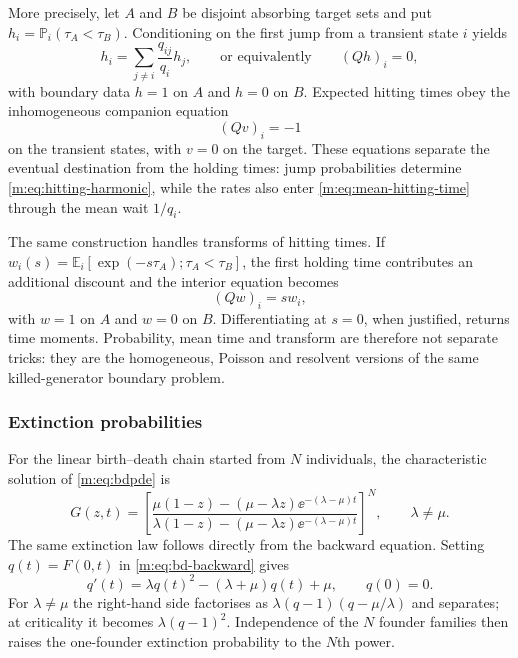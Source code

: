 More precisely, let $A$ and $B$ be disjoint absorbing target sets and put
$h_i=\mathbb P_i(\tau_A<\tau_B)$.  Conditioning on the first jump from a transient
state $i$ yields
\begin{equation}
  h_i=\sum_{j\neq i}\frac{q_{ij}}{q_i}h_j,
  \qquad\text{or equivalently}\qquad
  (Qh)_i=0,
  \label{m:eq:hitting-harmonic}
\end{equation}
with boundary data $h=1$ on $A$ and $h=0$ on $B$.  Expected hitting times obey
the inhomogeneous companion equation
\begin{equation}
  (Qv)_i=-1
  \label{m:eq:mean-hitting-time}
\end{equation}
on the transient states, with $v=0$ on the target.  These equations separate the
eventual destination from the holding times: jump probabilities determine
\cref{m:eq:hitting-harmonic}, while the rates also enter
\cref{m:eq:mean-hitting-time} through the mean wait $1/q_i$.

The same construction handles transforms of hitting times.  If
$w_i(s)=\mathbb E_i[\exp(-s\tau_A);\tau_A<\tau_B]$, the first holding time
contributes an additional discount and the interior equation becomes
\begin{equation}
  (Qw)_i=s w_i,
  \label{m:eq:hitting-laplace}
\end{equation}
with $w=1$ on $A$ and $w=0$ on $B$.  Differentiating at $s=0$, when justified,
returns time moments.  Probability, mean time and transform are therefore not
separate tricks: they are the homogeneous, Poisson and resolvent versions of the
same killed-generator boundary problem.

\subsubsection{Extinction probabilities}\label{m:sec:extinction-probabilities}

For the linear birth--death chain started from $N$ individuals, the characteristic
solution of \cref{m:eq:bdpde} is \cite{Kendall1948}
\begin{equation}
  G(z,t)=
  \left[
  \frac{\mu(1-z)-(\mu-\lambda z)\ee^{-(\lambda-\mu)t}}
       {\lambda(1-z)-(\mu-\lambda z)\ee^{-(\lambda-\mu)t}}
  \right]^N,
  \qquad \lambda\neq\mu.
  \label{m:eq:bdsolution}
\end{equation}
The same extinction law follows directly from the backward equation.  Setting
$q(t)=F(0,t)$ in \cref{m:eq:bd-backward} gives
\begin{equation}
  q'(t)=\lambda q(t)^2-(\lambda+\mu)q(t)+\mu,
  \qquad q(0)=0.
  \label{m:eq:bd-extinction-riccati}
\end{equation}
For $\lambda\neq\mu$ the right-hand side factorises as
$\lambda(q-1)(q-\mu/\lambda)$ and separates; at criticality it becomes
$\lambda(q-1)^2$.  Independence of the $N$ founder families then raises the
one-founder extinction probability to the $N$th power.

